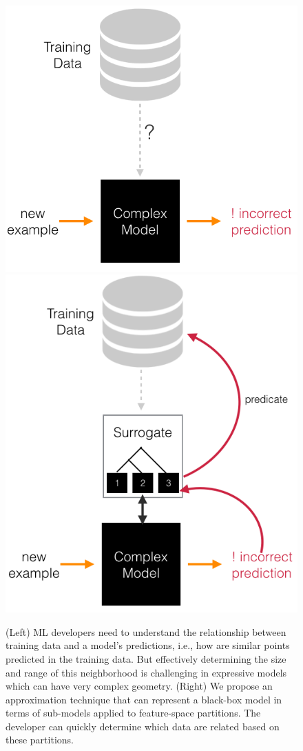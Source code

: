 \begin{figure}
    \centering
    \includegraphics[width=0.48\columnwidth]{figures/teaser1.png}
    \includegraphics[width=0.48\columnwidth]{figures/teaser2.png}
    \caption{(Left) ML developers need to understand the relationship between training data and a model's predictions, i.e., how are similar points predicted in the training data. But effectively determining the size and range of this neighborhood is challenging in expressive models which can have very complex geometry. (Right) We propose an approximation technique that can represent a black-box model in terms of sub-models applied to feature-space partitions. The developer can quickly determine which data are related based on these partitions.}
    \label{fig:my_label}
\end{figure}

